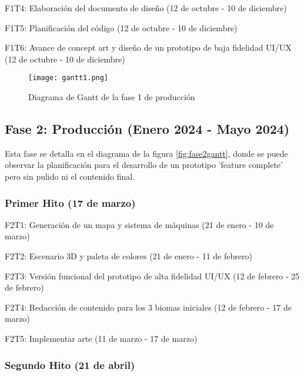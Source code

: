 \begin{compactitem}
\item F1T4: Elaboración del documento de diseño (12 de octubre - 10 de diciembre)
\item F1T5: Planificación del código (12 de octubre - 10 de diciembre)
\item F1T6: Avance de concept art y diseño de un prototipo de baja fidelidad UI/UX (12 de octubre - 10 de diciembre)
\end{compactitem}

\begin{figure}[H]
  \centering
	\texttt{[image: gantt1.png]}
  \caption{Diagrama de Gantt de la fase 1 de producción}
  \label{fig:fase1gantt}
\end{figure}

\subsection{Fase 2: Producción (Enero 2024 - Mayo 2024)}

Esta fase se detalla en el diagrama de la figura \ref{fig:fase2gantt}, donde se puede observar la planificación para el desarrollo de un prototipo 'feature complete' pero sin pulido 
ni el contenido final.

\subsubsection{Primer Hito (17 de marzo)}

\begin{compactitem}
\item F2T1: Generación de un mapa y sistema de máquinas (21 de enero - 10 de marzo)
\item F2T2: Escenario 3D y paleta de colores (21 de enero - 11 de febrero)
\item F2T3: Versión funcional del prototipo de alta fidelidad UI/UX (12 de febrero - 25 de febrero)
\item F2T4: Redacción de contenido para los 3 biomas iniciales (12 de febrero - 17 de marzo)
\item F2T5: Implementar arte (11 de marzo - 17 de marzo)
\end{compactitem}

\subsubsection{Segundo Hito (21 de abril)}


